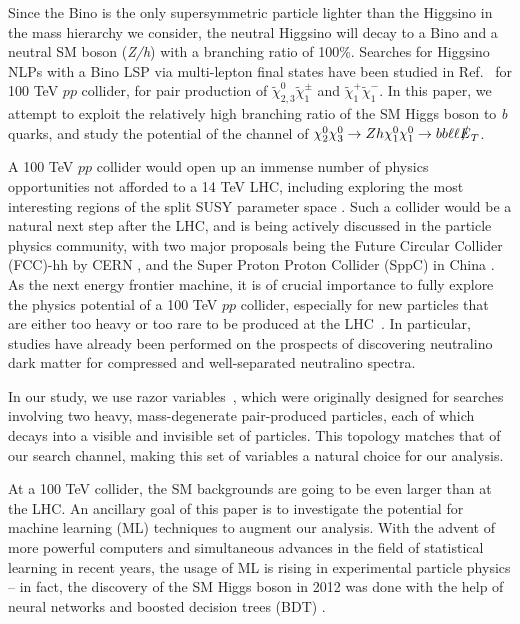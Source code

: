 \documentclass[a4paper,11pt]{article}
\newcommand{\met}{{\slashed{E}_T}}
\begin{document}
 

Since the Bino is the only supersymmetric particle lighter than the Higgsino in
the mass hierarchy we consider, the neutral Higgsino will decay to a Bino and a
neutral SM boson (\emph{Z/h}) with a branching ratio of 100\%.  Searches for
Higgsino NLPs with a Bino LSP  via  multi-lepton final states have been
studied in Ref.~\cite{Gori:2014oua} for 100 TeV $pp$ collider, for pair production of $\widetilde\chi_{2,3}^0\widetilde\chi_1^\pm$ and  $\widetilde\chi_{1}^+\widetilde\chi_1^-$.    In this paper, we attempt to exploit the relatively high branching
ratio of the SM Higgs boson to \emph{b} quarks, and study the potential of the channel of
$\chi_2^0\chi_3^0\rightarrow Zh \chi_1^0\chi_1^0\rightarrow bb\ell\ell \met$.

A 100 TeV $pp$ collider would open up an immense number of physics
opportunities not afforded to a 14 TeV LHC, including exploring the
most interesting regions of the split SUSY parameter space
\citep{Arkani-Hamed:2015vfh}.
Such a collider would be a natural next step after the LHC, and is being
actively discussed in the particle physics community, with two major
proposals being the Future Circular Collider (FCC)-hh by CERN \citep{FCC-hh}, and the Super Proton Proton Collider (SppC)  
in China \citep{CEPC}.  As the next energy frontier machine, it is of 
crucial importance to fully explore the physics potential of a 100 TeV $pp$
collider, especially for new particles that are either too heavy or too rare 
to be produced at the LHC~\citep{Arkani-Hamed:2015vfh,Contino:2016spe,Golling:2016gvc,Mangano:2016jyj}.
In particular, studies have already been performed on the prospects of
discovering neutralino dark matter for compressed \cite{Low:2014cba, diCortona:2014yua,Cirelli:2014dsa,Mahbubani:2018tin,Han:2018wus}
and well-separated \cite{Gori:2014oua,Acharya:2014pua}
neutralino spectra.


In our study, we use razor variables~\citep{Rogan:2010kb}, which were originally designed
for searches involving two heavy, mass-degenerate pair-produced
particles, each of which decays into a visible and invisible set of
particles. This topology matches that of our search channel, making this
set of variables a natural choice for our analysis.  

At a 100 TeV collider, the  SM backgrounds are going to be even larger than
at the LHC.  An ancillary goal of this paper is to investigate the
potential for machine learning (ML) techniques to augment our analysis.
With the advent of more powerful computers and simultaneous advances in
the field of statistical learning in recent years, the usage of ML is
rising in experimental particle physics -- in fact, the discovery of the
SM Higgs boson in 2012 was done with the help of neural networks
\citep{Aad:2012tfa} and boosted decision trees (BDT)
\citep{Chatrchyan:2012xdj}.
\end{document}
